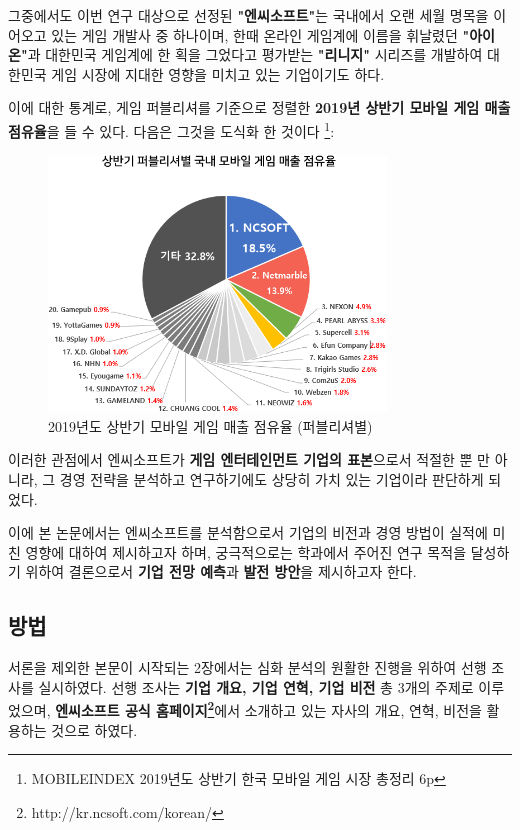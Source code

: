 \documentclass[11pt]{oblivoir}
\begin{document}
			그중에서도 이번 연구 대상으로 선정된 \textbf{"엔씨소프트"}는 국내에서 오랜 세월 명목을 이어오고 있는 게임 개발사 중 하나이며, 한때 온라인 게임계에 이름을 휘날렸던 \textbf{"아이온"}과 대한민국 게임계에 한 획을 그었다고 평가받는 \textbf{"리니지"} 시리즈를 개발하여 대한민국 게임 시장에 지대한 영향을 미치고 있는 기업이기도 하다. 
			
			이에 대한 통계로, 게임 퍼블리셔를 기준으로 정렬한 \textbf{2019년 상반기 모바일 게임 매출 점유율}을 들 수 있다. 다음은 그것을 도식화 한 것이다
			\footnote{MOBILEINDEX 2019년도 상반기 한국 모바일 게임 시장 총정리 6p}:
			
			
			\begin{figure}[htbp]
				\centering
				\includegraphics[width=0.8\textwidth]{Pictures/MobileMaechul.png}
				\caption{2019년도 상반기 모바일 게임 매출 점유율 (퍼블리셔별)}
			\end{figure}
			
			이러한 관점에서 엔씨소프트가 \textbf{게임 엔터테인먼트 기업의 표본}으로서 적절한 뿐 만 아니라, 그 경영 전략을 분석하고 연구하기에도 상당히 가치 있는 기업이라 판단하게 되었다.
			
			이에 본 논문에서는 엔씨소프트를 분석함으로서 기업의 비전과 경영 방법이 실적에 미친 영향에 대하여 제시하고자 하며, 궁극적으로는 학과에서 주어진 연구 목적을 달성하기 위하여 결론으로서 \textbf{기업 전망 예측}과 \textbf{발전 방안}을 제시하고자 한다.
					
		\subsection{방법}
			서론을 제외한 본문이 시작되는 2장에서는 심화 분석의 원활한 진행을 위하여 선행 조사를 실시하였다. 선행 조사는 \textbf{기업 개요, 기업 연혁, 기업 비전} 총 3개의 주제로 이루었으며, \textbf{엔씨소프트 공식 홈페이지\footnote{http://kr.ncsoft.com/korean/}}에서 소개하고 있는 자사의 개요, 
			연혁, 비전을 활용하는 것으로 하였다. 
			
\end{document}

